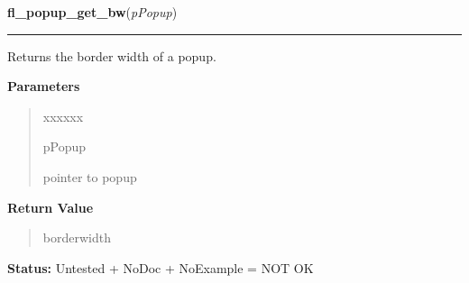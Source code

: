 \hspace{.8\funcindent}\begin{boxedminipage}{\funcwidth}

    \raggedright \textbf{fl\_popup\_get\_bw}(\textit{pPopup})

    \vspace{-1.5ex}

    \rule{\textwidth}{0.5\fboxrule}
\setlength{\parskip}{2ex}
    Returns the border width of a popup.

\setlength{\parskip}{1ex}
      \textbf{Parameters}
      \vspace{-1ex}

      \begin{quote}
        \begin{Ventry}{xxxxxx}

          \item[pPopup]

          pointer to popup

        \end{Ventry}

      \end{quote}

      \textbf{Return Value}
    \vspace{-1ex}

      \begin{quote}
      borderwidth

      \end{quote}

\textbf{Status:} Untested + NoDoc + NoExample = NOT OK



    \end{boxedminipage}

    \label{xformslib:library:fl_popup_set_bw}

    \vspace{0.5ex}

